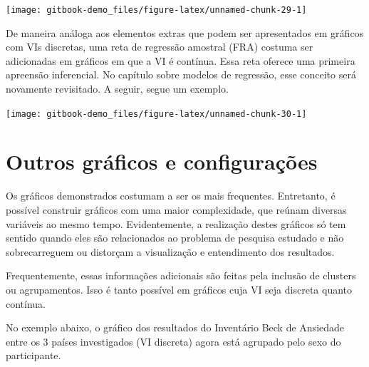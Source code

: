 \documentclass[
]{book}
\newenvironment{Shaded}{\begin{snugshade}}{\end{snugshade}}
\newcommand{\DataTypeTok}[1]{\textcolor[rgb]{0.13,0.29,0.53}{#1}}
\newcommand{\KeywordTok}[1]{\textcolor[rgb]{0.13,0.29,0.53}{\textbf{#1}}}
\newcommand{\NormalTok}[1]{#1}
\newcommand{\OperatorTok}[1]{\textcolor[rgb]{0.81,0.36,0.00}{\textbf{#1}}}
\newcommand{\StringTok}[1]{\textcolor[rgb]{0.31,0.60,0.02}{#1}}
\begin{document}
\begin{center}\texttt{[image: gitbook-demo\_files/figure-latex/unnamed-chunk-29-1]} \end{center}

De maneira análoga aos elementos extras que podem ser apresentados em gráficos com VIs discretas, uma reta de regressão amostral (FRA) costuma ser adicionadas em gráficos em que a VI é contínua. Essa reta oferece uma primeira apreensão inferencial. No capítulo sobre modelos de regressão, esse conceito será novamente revisitado. A seguir, segue um exemplo.

\begin{Shaded}
\end{Shaded}

\begin{center}\texttt{[image: gitbook-demo\_files/figure-latex/unnamed-chunk-30-1]} \end{center}

\hypertarget{outros-gruxe1ficos-e-configurauxe7uxf5es}{%
\section{Outros gráficos e configurações}\label{outros-gruxe1ficos-e-configurauxe7uxf5es}}

Os gráficos demonstrados costumam a ser os mais frequentes. Entretanto, é possível construir gráficos com uma maior complexidade, que reúnam diversas variáveis ao mesmo tempo. Evidentemente, a realização destes gráficos só tem sentido quando eles são relacionados ao problema de pesquisa estudado e não sobrecarreguem ou distorçam a visualização e entendimento dos resultados.

Frequentemente, essas informações adicionais são feitas pela inclusão de clusters ou agrupamentos. Isso é tanto possível em gráficos cuja VI seja discreta quanto contínua.

No exemplo abaixo, o gráfico dos resultados do Inventário Beck de Ansiedade entre os 3 países investigados (VI discreta) agora está agrupado pelo sexo do participante.
\end{document}

